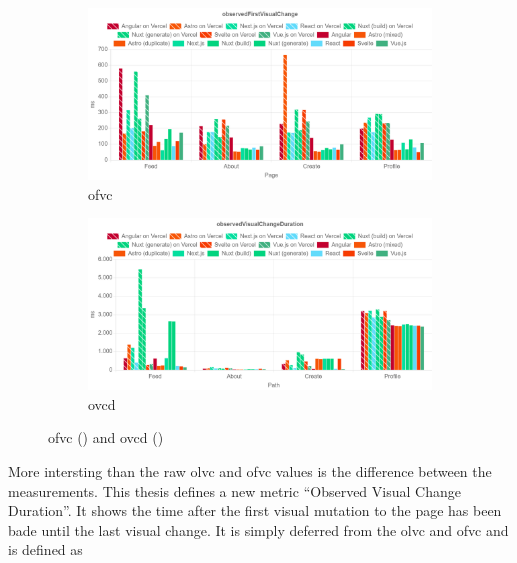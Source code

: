 \documentclass[a4paper, 12pt]{article}
\begin{document}
\begin{figure}[ht!]
  \centering
  \begin{subfigure}{0.95\linewidth}
    \begin{center}
      \includegraphics[width=\linewidth, keepaspectratio]{img/lighthouse-results/OFVC.png}
    \end{center}
    \caption{\acrfull{ofvc}}
    \label{subfig:LH:observedFirstVisualChange}
  \end{subfigure}
  \begin{subfigure}{0.95\linewidth}
    \begin{center}
      \includegraphics[width=\linewidth, keepaspectratio]{img/lighthouse-results/olvc-ofvc.png}
    \end{center}
    \caption{\acrfull{ovcd}}\label{subfig:LH:observedVisualChangeDuration}
    \label{fig:LH:OVCD}
  \end{subfigure}
  \caption{\acrfull{ofvc} () and \acrfull{ovcd} ()}
\end{figure}

More intersting than the raw \acrshort{olvc} and \acrshort{ofvc} values is the difference between the measurements.
This thesis defines a new metric \enquote{Observed Visual Change Duration}.
It shows the time after the first visual mutation to the page has been bade until the last visual change.
It is simply deferred from the \acrshort{olvc} and \acrshort{ofvc} and is defined as
\end{document}
